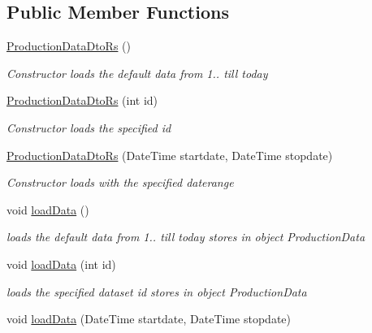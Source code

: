 \subsection*{Public Member Functions}
\begin{DoxyCompactItemize}
\item 
\hyperlink{classkpi_mvc_api_1_1_data_transfer_objects_1_1_production_data_dto_rs_a958f90d329c37714b754b3db8bf94e02}{Production\+Data\+Dto\+Rs} ()
\begin{DoxyCompactList}\small\item\em Constructor loads the default data from 1.. till today \end{DoxyCompactList}\item 
\hyperlink{classkpi_mvc_api_1_1_data_transfer_objects_1_1_production_data_dto_rs_af322603913a41645237ffe3d7060cf51}{Production\+Data\+Dto\+Rs} (int id)
\begin{DoxyCompactList}\small\item\em Constructor loads the specified id \end{DoxyCompactList}\item 
\hyperlink{classkpi_mvc_api_1_1_data_transfer_objects_1_1_production_data_dto_rs_a1694f3f486bf07ce79efd887f9086d63}{Production\+Data\+Dto\+Rs} (Date\+Time startdate, Date\+Time stopdate)
\begin{DoxyCompactList}\small\item\em Constructor loads with the specified daterange \end{DoxyCompactList}\item 
void \hyperlink{classkpi_mvc_api_1_1_data_transfer_objects_1_1_production_data_dto_rs_a58fd92fa5a7191f03f2e0942afaaa65d}{load\+Data} ()
\begin{DoxyCompactList}\small\item\em loads the default data from 1.. till today stores in object {\ttfamily Production\+Data} \end{DoxyCompactList}\item 
void \hyperlink{classkpi_mvc_api_1_1_data_transfer_objects_1_1_production_data_dto_rs_a7d16375d7b096dca36d98942a6e0f80f}{load\+Data} (int id)
\begin{DoxyCompactList}\small\item\em loads the specified dataset id stores in object {\ttfamily Production\+Data} \end{DoxyCompactList}\item 
void \hyperlink{classkpi_mvc_api_1_1_data_transfer_objects_1_1_production_data_dto_rs_a375b888daefaacc620cffef48ac7ab81}{load\+Data} (Date\+Time startdate, Date\+Time stopdate)

\end{DoxyCompactItemize}
